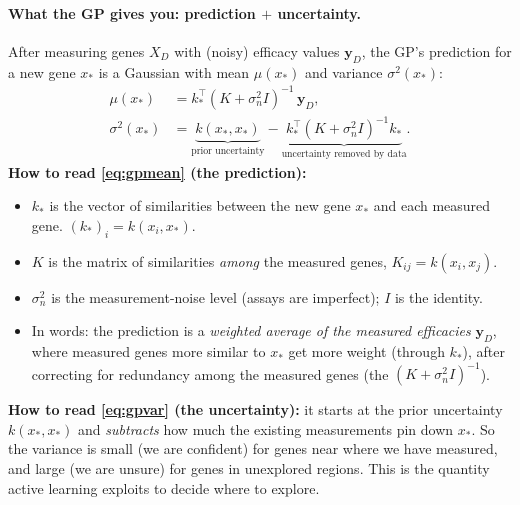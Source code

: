 \documentclass[11pt]{article}
\begin{document}
\paragraph{What the GP gives you: prediction $+$ uncertainty.} After measuring genes
$X_D$ with (noisy) efficacy values $\mathbf{y}_D$, the GP's prediction for a new gene
$x_\ast$ is a Gaussian with mean $\mu(x_\ast)$ and variance $\sigma^2(x_\ast)$:
\begin{align}
\mu(x_\ast) &= k_\ast^\top (K+\sigma_n^2 I)^{-1}\,\mathbf{y}_D, \label{eq:gpmean}\\
\sigma^2(x_\ast) &= \underbrace{k(x_\ast,x_\ast)}_{\text{prior uncertainty}} - \underbrace{k_\ast^\top (K+\sigma_n^2 I)^{-1} k_\ast}_{\text{uncertainty removed by data}}. \label{eq:gpvar}
\end{align}
\textbf{How to read \eqref{eq:gpmean} (the prediction):}
\begin{itemize}[leftmargin=2em,itemsep=1pt]
\item $k_\ast$ is the vector of similarities between the new gene $x_\ast$ and each measured
gene. $(k_\ast)_i=k(x_i,x_\ast)$.
\item $K$ is the matrix of similarities \emph{among} the measured genes, $K_{ij}=k(x_i,x_j)$.
\item $\sigma_n^2$ is the measurement-noise level (assays are imperfect); $I$ is the identity.
\item In words: the prediction is a \emph{weighted average of the measured efficacies}
$\mathbf{y}_D$, where measured genes more similar to $x_\ast$ get more weight (through
$k_\ast$), after correcting for redundancy among the measured genes (the $(K+\sigma_n^2 I)^{-1}$).
\end{itemize}
\textbf{How to read \eqref{eq:gpvar} (the uncertainty):} it starts at the prior uncertainty
$k(x_\ast,x_\ast)$ and \emph{subtracts} how much the existing measurements pin down $x_\ast$.
So the variance is small (we are confident) for genes near where we have measured, and
large (we are unsure) for genes in unexplored regions. This is the quantity active learning
exploits to decide where to explore.
\end{document}
